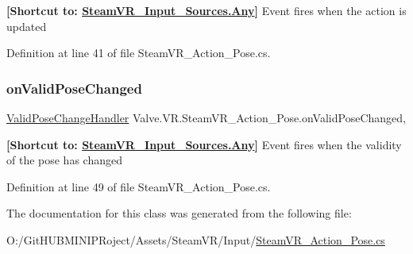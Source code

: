 {\bfseries{\mbox{[}Shortcut to\+: \mbox{\hyperlink{namespace_valve_1_1_v_r_a82e5bf501cc3aa155444ee3f0662853faed36a1ef76a59ee3f15180e0441188ad}{Steam\+V\+R\+\_\+\+Input\+\_\+\+Sources.\+Any}}\mbox{]}}} Event fires when the action is updated 



Definition at line 41 of file Steam\+V\+R\+\_\+\+Action\+\_\+\+Pose.\+cs.

\mbox{\label{class_valve_1_1_v_r_1_1_steam_v_r___action___pose_a058e7ac6982769f7b51e41a4e61ad7de}} 
\subsubsection{\texorpdfstring{onValidPoseChanged}{onValidPoseChanged}}
{\footnotesize\ttfamily \mbox{\hyperlink{class_valve_1_1_v_r_1_1_steam_v_r___action___pose_a742270a6bddfea2afd7f535378ae7830}{Valid\+Pose\+Change\+Handler}} Valve.\+V\+R.\+Steam\+V\+R\+\_\+\+Action\+\_\+\+Pose.\+on\+Valid\+Pose\+Changed\hspace{0.3cm}{\ttfamily [add]}, {\ttfamily [remove]}}



{\bfseries{\mbox{[}Shortcut to\+: \mbox{\hyperlink{namespace_valve_1_1_v_r_a82e5bf501cc3aa155444ee3f0662853faed36a1ef76a59ee3f15180e0441188ad}{Steam\+V\+R\+\_\+\+Input\+\_\+\+Sources.\+Any}}\mbox{]}}} Event fires when the validity of the pose has changed 



Definition at line 49 of file Steam\+V\+R\+\_\+\+Action\+\_\+\+Pose.\+cs.



The documentation for this class was generated from the following file\+:\begin{DoxyCompactItemize}
\item 
O\+:/\+Git\+H\+U\+B\+M\+I\+N\+I\+P\+Roject/\+Assets/\+Steam\+V\+R/\+Input/\mbox{\hyperlink{_steam_v_r___action___pose_8cs}{Steam\+V\+R\+\_\+\+Action\+\_\+\+Pose.\+cs}}\end{DoxyCompactItemize}
